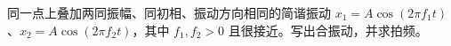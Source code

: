同一点上叠加两同振幅、同初相、振动方向相同的简谐振动 $x_1=A\cos(2\pi f_1t)$、$x_2=A\cos(2\pi f_2t)$，其中 $f_1,f_2>0$ 且很接近。写出合振动，并求拍频。
